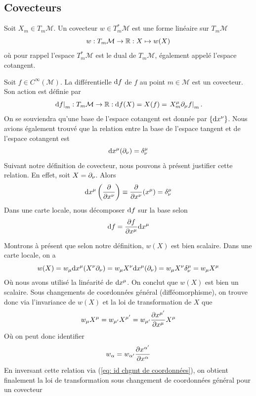 \subsection{Covecteurs}

Soit $X_m \in T_m \mathcal{M}$. Un covecteur $w\in T_m^*\mathcal{M}$ est une forme linéaire sur $T_m\mathcal{M}$ 
\begin{equation}
w  : T_m \mathcal{M} \rightarrow \mathbb{R} : X \mapsto w(X)
\end{equation}
où pour rappel l'espace $T^*_m \mathcal{M}$ est le dual de $T_m\mathcal{M}$, également appelé l'espace cotangent. 

\begin{exmp}
    Soit $f\in C^\infty(\mathcal{M})$. La différentielle $\mathrm{d} f$ de $f$ au point $m\in \mathcal{M}$ est un covecteur. Son action est définie par
    \begin{equation}
        \left. \mathrm{d} f \right|_m : T_m \mathcal{M} \to \mathbb{R} : \mathrm{d} f (X) = X(f) = \left. X^\mu_m \partial_\mu f \right|_m.
    \end{equation}
On se souviendra qu'une base de l'espace cotangent est donnée par $\{ \mathrm{d} x^\nu\}$. Nous avions également trouvé que la relation entre la base de l'espace tangent et de l'espace cotangent est
\begin{equation}
    \td  x^\mu (\pd_\nu) = \delta\indices*{^\mu_\nu}
\end{equation}
Suivant notre définition de covecteur, nous pouvons à présent justifier cette relation. En effet, soit $X = \partial_\nu$. Alors
\begin{equation}
    \td x^\mu \lt \frac{\pd}{\pd x^\nu}\rt \equiv \frac{\pd}{\pd x^\nu}(x^\mu) = \delta\indices*{^\mu_\nu}
\end{equation}
Dans une carte locale, nous décomposer $\mathrm{d} f$ sur la base selon
\begin{equation}
    \mathrm{d} f = \frac{\partial f}{\partial x^\mu} \mathrm{d} x^\mu
\end{equation}
\end{exmp}
Montrons à présent que selon notre définition, $w(X)$ est bien scalaire. Dans une carte locale, on a
\begin{equation}
    w(X) = w_\mu \td x^\mu (X^\nu \pd_\nu ) = w_\mu X^\nu \td x^\mu (\pd_\nu) = w_\mu X^\nu \delta\indices*{^\mu_\nu} = w_\mu X^\mu
\end{equation}
Où nous avons utilisé la linéarité de $\mathrm{d} x^\mu$. On conclut que $w(X)$ est bien un scalaire. Sous changements de coordonnées général (difféomorphisme), on trouve donc via l'invariance de $w(X)$ et la loi de transformation de $X$ que
\begin{equation}
    w_\mu X^\mu = w_{\mu'} X^{\mu'} = w_{\mu'} \frac{\partial x^{\mu'}}{\partial x^\mu} X^\mu
\end{equation}
Où on peut donc identifier
\begin{equation}
    w_\alpha = w_{\alpha'} \frac{\partial x^{\alpha'}}{\partial x^\alpha}
\end{equation}
En inversant cette relation via (\ref{eq: id chgmt de coordonnées}), on obtient finalement la loi de transformation sous changement de coordonnées général pour un covecteur

